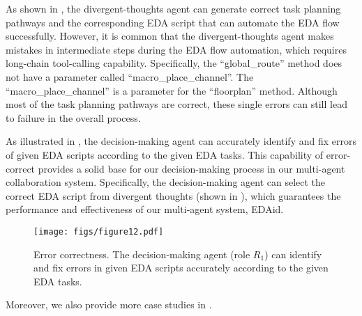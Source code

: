 As shown in , the divergent-thoughts agent can generate correct task planning pathways and the corresponding EDA script that can automate the EDA flow successfully.
However, it is common that the divergent-thoughts agent makes mistakes in intermediate steps during the EDA flow automation, which requires long-chain tool-calling capability.
Specifically, the ``global\_route'' method does not have a parameter called ``macro\_place\_channel''.
The ``macro\_place\_channel'' is a parameter for the ``floorplan'' method.
Although most of the task planning pathways are correct, these single errors can still lead to failure in the overall process.

As illustrated in , the decision-making agent can accurately identify and fix errors of given EDA scripts according to the given EDA tasks.
This capability of error-correct provides a solid base for our decision-making process in our multi-agent collaboration system.
Specifically, the decision-making agent can select the correct EDA script from divergent thoughts (shown in ), which guarantees the performance and effectiveness of our multi-agent system, EDAid.
\begin{figure*}[tb!]
    \centering
    \texttt{[image: figs/figure12.pdf]} 
    \caption{Error correctness. The decision-making agent (role $R_{1}$) can identify and fix errors in given EDA scripts accurately according to the given EDA tasks.}
    \label{fig:cases2}
\end{figure*}

Moreover, we also provide more case studies in .
